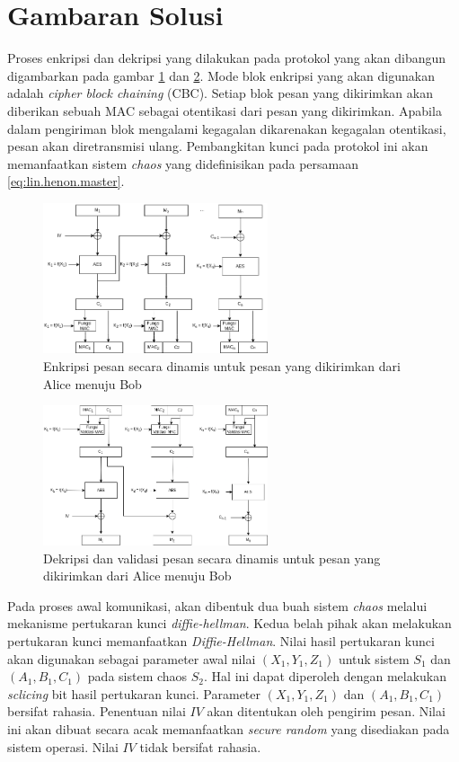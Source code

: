 \section{Gambaran Solusi}

Proses enkripsi dan dekripsi yang dilakukan pada protokol yang akan dibangun digambarkan pada gambar \ref{fig:solution.encrypt} dan \ref{fig:solution.decrypt}. Mode blok enkripsi yang akan digunakan adalah \emph{cipher block chaining} (CBC). Setiap blok pesan yang dikirimkan akan diberikan sebuah MAC sebagai otentikasi dari pesan yang dikirimkan. Apabila dalam pengiriman blok mengalami kegagalan dikarenakan kegagalan otentikasi, pesan akan diretransmisi ulang. Pembangkitan kunci pada protokol ini akan memanfaatkan sistem \emph{chaos} yang didefinisikan pada persamaan \ref{eq:lin.henon.master}.

\begin{figure}[!h]
  \centering
  \includegraphics[width=250px]{chapters/res/chapter-3/img/encrypt.png}
  \caption{Enkripsi pesan secara dinamis untuk pesan yang dikirimkan dari Alice menuju Bob} \label{fig:solution.encrypt}
\end{figure}

\begin{figure}[!h]
  \centering
  \includegraphics[width=250px]{chapters/res/chapter-3/img/decrypt.png}
  \caption{Dekripsi dan validasi pesan secara dinamis untuk pesan yang dikirimkan dari Alice menuju Bob} \label{fig:solution.decrypt}
\end{figure}

Pada proses awal komunikasi, akan dibentuk dua buah sistem \emph{chaos} melalui mekanisme pertukaran kunci \emph{diffie-hellman}. Kedua belah pihak akan melakukan pertukaran kunci memanfaatkan \emph{Diffie-Hellman}. Nilai hasil pertukaran kunci akan digunakan sebagai parameter awal nilai $(X_1, Y_1, Z_1)$ untuk sistem $S_1$ dan $(A_1, B_1, C_1)$ pada sistem chaos $S_2$. Hal ini dapat diperoleh dengan melakukan \emph{sclicing} bit hasil pertukaran kunci. Parameter $(X_1, Y_1, Z_1)$ dan $(A_1, B_1, C_1)$ bersifat rahasia. Penentuan nilai $IV$ akan ditentukan oleh pengirim pesan. Nilai ini akan dibuat secara acak memanfaatkan \emph{secure random} yang disediakan pada sistem operasi. Nilai $IV$  tidak bersifat rahasia.


